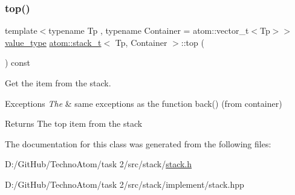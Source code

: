 \subsubsection{\texorpdfstring{top()}{top()}}
{\footnotesize\ttfamily template$<$typename Tp , typename Container  = atom\+::vector\+\_\+t$<$\+Tp$>$$>$ \\
\hyperlink{classatom_1_1stack__t_a37733753643a75fca01979480f888d8e}{value\+\_\+type} \hyperlink{classatom_1_1stack__t}{atom\+::stack\+\_\+t}$<$ Tp, Container $>$\+::top (\begin{DoxyParamCaption}{ }\end{DoxyParamCaption}) const\hspace{0.3cm}{\ttfamily [inline]}}



Get the item from the stack. 


\begin{DoxyExceptions}{Exceptions}
{\em The} & same exceptions as the function back() (from container) \\
\hline
\end{DoxyExceptions}
\begin{DoxyReturn}{Returns}
The top item from the stack 
\end{DoxyReturn}


The documentation for this class was generated from the following files\+:\begin{DoxyCompactItemize}
\item 
D\+:/\+Git\+Hub/\+Techno\+Atom/task 2/src/stack/\hyperlink{stack_8h}{stack.\+h}\item 
D\+:/\+Git\+Hub/\+Techno\+Atom/task 2/src/stack/implement/stack.\+hpp\end{DoxyCompactItemize}
